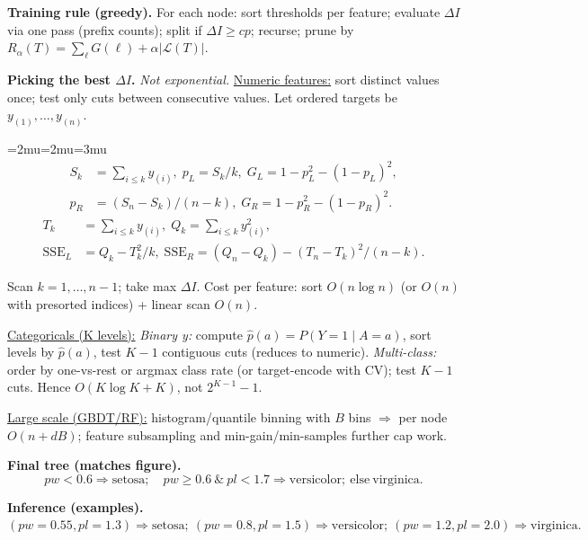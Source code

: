 \documentclass[10pt,landscape]{article}
\newcommand{\tight}{\begingroup\scriptsize\thinmuskip=2mu\medmuskip=2mu\thickmuskip=3mu}
\newcommand{\untight}{\endgroup}
\begin{document}
\begin{multicols}{3}
    \textbf{Training rule (greedy).} For each node: sort thresholds per feature; evaluate $\Delta I$ via one pass (prefix counts); split if $\Delta I\!\ge\!cp$; recurse; prune by $R_\alpha(T)=\sum_{\ell}G(\ell)+\alpha|\mathcal L(T)|$.

    \textbf{Picking the best $\Delta I$.} \emph{Not exponential.}
    \underline{Numeric features:} sort distinct values once; test only cuts
    between consecutive values. Let ordered targets be $y_{(1)},\dots,y_{(n)}$.

    \tight
    \[
        \begin{aligned}
            S_k & =\sum_{i\le k}y_{(i)},\; p_L=S_k/k,\; G_L=1-p_L^2-(1-p_L)^2, \\
            p_R & =(S_n-S_k)/(n-k),\; G_R=1-p_R^2-(1-p_R)^2.
        \end{aligned}
    \]
    \[
        \begin{aligned}
            T_k            & =\sum_{i\le k}y_{(i)},\; Q_k=\sum_{i\le k}y_{(i)}^2, \\
            \mathrm{SSE}_L & =Q_k-T_k^2/k,\;
            \mathrm{SSE}_R=(Q_n-Q_k)-(T_n-T_k)^2/(n-k).
        \end{aligned}
    \]
    \untight



    Scan $k=1,\dots,n\!-\!1$; take max $\Delta I$. Cost per feature: sort $O(n\log n)$ (or $O(n)$ with presorted indices) + linear scan $O(n)$.

    \underline{Categoricals (K levels):} \emph{Binary y:} compute $\hat p(a)=P(Y\!=\!1\mid A\!=\!a)$, sort levels by $\hat p(a)$, test $K\!-\!1$ contiguous cuts (reduces to numeric). \emph{Multi-class:} order by one-vs-rest or argmax class rate (or target-encode with CV); test $K\!-\!1$ cuts. Hence $O(K\log K+K)$, not $2^{K-1}\!-\!1$.

    \underline{Large scale (GBDT/RF):} histogram/quantile binning with $B$ bins $\Rightarrow$ per node $O(n+dB)$; feature subsampling and min-gain/min-samples further cap work.

    \textbf{Final tree (matches figure).}
    \[
        \boxed{pw<0.6}\Rightarrow \text{setosa};\quad
        pw\ge0.6 \ \&\ \boxed{pl<1.7}\Rightarrow \text{versicolor};\ \text{else}\ \text{virginica}.
    \]

    \textbf{Inference (examples).}
    $(pw{=}0.55,pl{=}1.3)\!\Rightarrow\!\text{setosa};\
        (pw{=}0.8,pl{=}1.5)\!\Rightarrow\!\text{versicolor};\
        (pw{=}1.2,pl{=}2.0)\!\Rightarrow\!\text{virginica}.$


\end{multicols}
\end{document}
